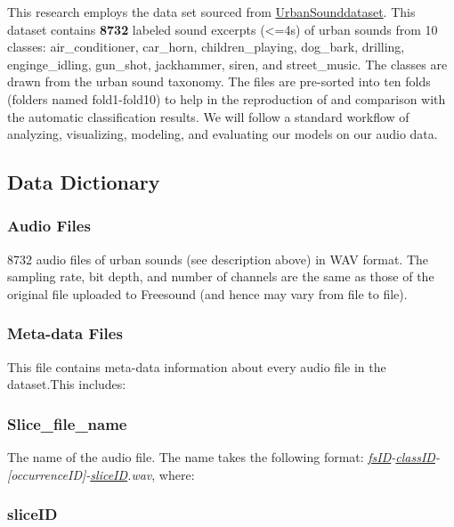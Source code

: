 This research employs the data set sourced from
\href{https://urbansounddataset.weebly.com/urbansound8k.html}{UrbanSounddataset}.
This dataset contains \textbf{8732} labeled sound excerpts
(\textless{}=4s) of urban sounds from 10 classes: air\_conditioner,
car\_horn, children\_playing, dog\_bark, drilling, enginge\_idling,
gun\_shot, jackhammer, siren, and street\_music. The classes are drawn
from the urban sound taxonomy. The files are pre-sorted into ten folds
(folders named fold1-fold10) to help in the reproduction of and
comparison with the automatic classification results. We will follow a
standard workflow of analyzing, visualizing, modeling, and evaluating
our models on our audio data.

\hypertarget{data-dictionary}{%
\subsection{Data Dictionary}\label{data-dictionary}}

\hypertarget{audio-files}{%
\subsubsection{Audio Files}\label{audio-files}}

8732 audio files of urban sounds (see description above) in WAV format.
The sampling rate, bit depth, and number of channels are the same as
those of the original file uploaded to Freesound (and hence may vary
from file to file).

\hypertarget{meta-data-files}{%
\subsubsection{Meta-data Files}\label{meta-data-files}}

This file contains meta-data information about every audio file in the
dataset.This includes:

\hypertarget{slice_file_name}{%
\subsubsection{Slice\_file\_name}\label{slice_file_name}}

The name of the audio file. The name takes the following format:
\emph{\protect\hyperlink{fsid}{fsID}-\protect\hyperlink{classid}{classID}-{[}occurrenceID{]}-\protect\hyperlink{sliceid}{sliceID}.wav},
where:

\hypertarget{sliceid}{%
\subsubsection{sliceID}\label{sliceid}}

